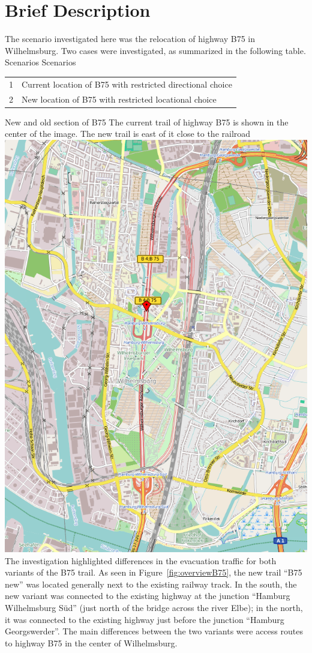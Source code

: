 \section{Brief Description}
The scenario investigated here was the relocation of highway B75 in Wilhelmsburg. Two cases were investigated, as summarized in the following table.
%
\createtable%
	{Scenarios}%
	{Scenarios}%
	{\label{table:b75scenarios}}%
	{%
	\begin{tabular}{|l | l|}
	\hline
	1 & Current location of B75 with restricted directional choice\\
	2 & New location of B75 with restricted locational choice\\
	\hline
\end{tabular}
}%
{}%
%
\createfigure%
	{New and old section of B75}%
	{The current trail of highway B75 is shown in the center of the image. The new trail is east of it close to the railroad}%
	{\label{fig:overviewB75}}%
	{\includegraphics[width=0.7\linewidth]{scenarios/figures/B75overview}}%
{}
%
The investigation highlighted differences in the evacuation traffic for both variants of the B75 trail. As seen in Figure~\ref{fig:overviewB75}, the new trail ``B75 new'' was located generally next to the existing railway track. In the south, the new variant was connected to the existing highway at the junction ``Hamburg Wilhelmsburg Süd'' (just north of the bridge across the river Elbe); in the north, it was connected to the existing highway just before the junction ``Hamburg Georgswerder''. The main differences between the two variants were access routes to highway B75 in the center of Wilhelmsburg.

